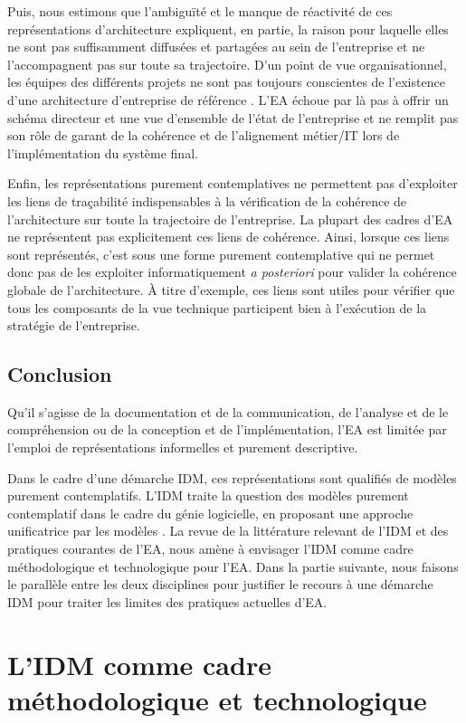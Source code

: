 Puis, nous estimons que l'ambiguïté et le manque de réactivité de ces
représentations d'architecture expliquent, en partie, la raison pour laquelle
elles ne sont pas suffisamment diffusées et partagées au sein de l'entreprise
et ne l'accompagnent pas sur toute sa trajectoire. D'un point de vue
organisationnel, les équipes des différents projets ne sont pas toujours
conscientes de l'existence d'une architecture d'entreprise de référence
\cite{shah2007frameworks}. L'EA échoue par là pas à offrir un schéma directeur
et une vue d'ensemble de l'état de l'entreprise et ne remplit pas son rôle de
garant de la cohérence et de l'alignement métier/IT lors de l'implémentation du
système final.

 Enfin, les représentations purement contemplatives ne permettent pas
d'exploiter les liens de traçabilité indispensables à la vérification de la
cohérence de l'architecture sur toute la trajectoire de l'entreprise. La
plupart des cadres d'EA ne représentent pas explicitement ces liens de
cohérence. Ainsi, lorsque ces liens sont représentés, c'est sous une forme
purement contemplative qui ne permet donc pas de les exploiter informatiquement
\textit{a posteriori} pour valider la cohérence globale de l'architecture. À
titre d'exemple, ces liens sont utiles pour vérifier que tous les composants de
la vue technique participent bien à l'exécution de la stratégie de
l'entreprise.

\subsection{Conclusion} Qu'il s'agisse de la documentation et de la
communication, de l'analyse et de le compréhension ou de la conception
et de l'implémentation, l'EA est limitée par l'emploi de
représentations informelles et purement descriptive.

Dans le cadre d'une démarche IDM, ces représentations sont qualifiés
de modèles purement contemplatifs. L'IDM traite la question des
modèles purement contemplatif dans le cadre du génie logicielle, en
proposant une approche unificatrice par les modèles
\cite{jezequel2006genie}. La revue de la littérature relevant de l'IDM
et des pratiques courantes de l'EA, nous amène à envisager l'IDM comme
cadre méthodologique et technologique pour l'EA. Dans la partie
suivante, nous faisons le parallèle entre les deux disciplines pour
justifier le recours à une démarche IDM  pour traiter les limites  des
pratiques actuelles d'EA.

\section{L'IDM comme cadre méthodologique et technologique}

